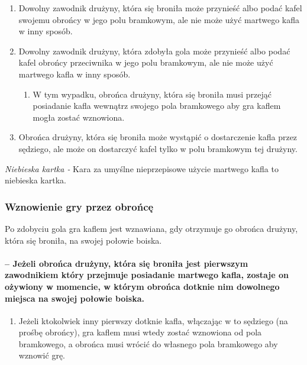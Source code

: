 \documentclass[12pt]{article}
\begin{document}
\begin{enumerate}
	\item
	      Dowolny zawodnik drużyny, która się broniła może przynieść albo podać
	      kafel swojemu obrońcy w jego polu bramkowym, ale nie może użyć
	      martwego kafla w inny sposób.
	\item
	      Dowolny zawodnik drużyny, która zdobyła gola może przynieść albo podać
	      kafel obrońcy przeciwnika w jego polu bramkowym, ale nie może użyć
	      martwego kafla w inny sposób.

	      \begin{enumerate}
		      \item
		            W tym wypadku, obrońca drużyny, która się broniła musi przejąć
		            posiadanie kafla wewnątrz swojego pola bramkowego aby gra kaflem
		            mogła zostać wznowiona.
	      \end{enumerate}
	\item
	      Obrońca drużyny, która się broniła może wystąpić o dostarczenie kafla
	      przez sędziego, ale może on dostarczyć kafel tylko w polu bramkowym
	      tej drużyny.
\end{enumerate}

\emph{Niebieska kartka -} Kara za umyślne nieprzepisowe użycie martwego
kafla to niebieska kartka.

\subsubsection{Wznowienie gry przez obrońcę}
Po zdobyciu gola gra
kaflem jest wznawiana, gdy otrzymuje go obrońca drużyny, która się
broniła, na swojej połowie boiska.

\paragraph{ -- Jeżeli obrońca drużyny, która się broniła jest
	pierwszym zawodnikiem który przejmuje posiadanie martwego kafla, zostaje
	on ożywiony w momencie, w którym obrońca dotknie nim dowolnego miejsca
	na swojej połowie boiska.}

\begin{enumerate}
	\item
	      Jeżeli ktokolwiek inny pierwszy dotknie kafla, włączając w to sędziego
	      (na prośbę obrońcy), gra kaflem musi wtedy zostać wznowiona od pola
	      bramkowego, a obrońca musi wrócić do własnego pola bramkowego aby
	      wznowić grę.
\end{enumerate}
\end{document}

